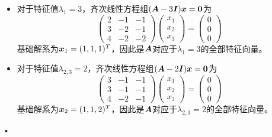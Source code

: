 \begin{frame}
  
  \begin{itemize}
  \item 对于特征值$\lambda_1=3$，齐次线性方程组$(\MA-3\MI)\vx=\M0$为
    $$
    \left(\begin{array}{rrr}
            2&-1&-1\\
            3&-2&-1\\
            4&-2&-2
          \end{array}\right)\left(
          \begin{array}{c}
            x_1\\
            x_2\\
            x_3
          \end{array}
        \right)=\left(
          \begin{array}{c}
            0\\
            0\\
            0
          \end{array}
        \right)
        $$
        基础解系为${\boldsymbol{x}}_1=(1,1,1)^T$，因此是$\boldsymbol{A}$对应于$\lambda_1=3$的全部特征向量。\\[0.1in]
        
      \item 
        对于特征值$\lambda_{2,3}=2$，齐次线性方程组$(\MA-2\MI)\vx=\M0$为
        $$
        \left(\begin{array}{rrr}
                3&-1&-1\\
                3&-1&-1\\
                4&-2&-1
              \end{array}\right)\left(
              \begin{array}{c}
                x_1\\
                x_2\\
                x_3
              \end{array}
            \right)=\left(
              \begin{array}{c}
                0\\
                0\\
                0
              \end{array}
            \right)
            $$
            基础解系为${\boldsymbol{x}}_2=(1,1,2)^T$，因此是$\boldsymbol{A}$对应于$\lambda_{2,3}=2$的全部特征向量。

          \end{itemize}•
          

          
        \end{frame}



